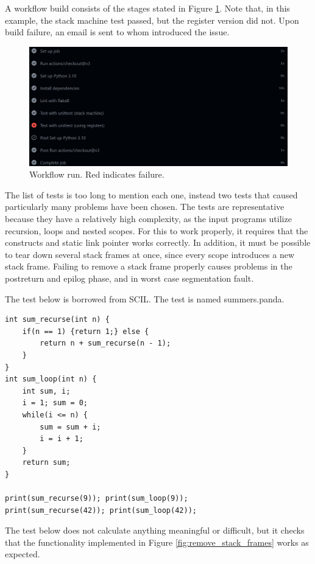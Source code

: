 A workflow build consists of the stages stated in Figure \ref{fig:workflow_run}.  Note that, in this example, the stack machine test passed, but the register version did not. Upon build failure, an email is sent to whom introduced the issue.

\begin{figure}[H]
    \centering
    \includegraphics[width=1\textwidth]{misc/images/workflow_run.png}
    \caption{Workflow run. Red indicates failure.}
    \label{fig:workflow_run}
\end{figure}

The list of tests is too long to mention each one, instead two tests that caused particularly many problems have been chosen. The tests are representative because they have a relatively high complexity, as the input programs utilize recursion, loops and nested scopes. For this to work properly, it requires that the constructs and static link pointer works correctly. In addition, it must be possible to tear down several stack frames at once, since every scope introduces a new stack frame. Failing to remove a stack frame properly causes problems in the postreturn and epilog phase, and in worst case segmentation fault. 

The test below is borrowed from SCIL. The test is named summers.panda.

\begin{verbatim}
int sum_recurse(int n) {
    if(n == 1) {return 1;} else {
        return n + sum_recurse(n - 1);
    }
}
int sum_loop(int n) {
    int sum, i;
    i = 1; sum = 0;
    while(i <= n) {
        sum = sum + i;
        i = i + 1;
    }
    return sum;
}

print(sum_recurse(9)); print(sum_loop(9));
print(sum_recurse(42)); print(sum_loop(42));
\end{verbatim}

The test below does not calculate anything meaningful or difficult, but it checks that the functionality implemented in Figure \ref{fig:remove_stack_frames} works as expected.

